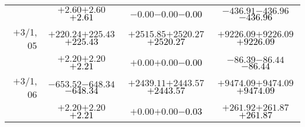 \documentclass[compress]{beamer}
\begin{document}
\begin{frame}
{\begin{tabular}{r | c | c | c}
           & $+2.60$\hspace{0.1 cm}$+2.60$\hspace{0.1 cm}\textcolor{black}{$+2.61$} & $-0.00$\hspace{0.1 cm}$-0.00$\hspace{0.1 cm}\textcolor{black}{$-0.00$} & $-436.91$\hspace{0.1 cm}$-436.96$\hspace{0.1 cm}\textcolor{black}{$-436.96$} \\
$+$3/1, 05 & $+220.24$\hspace{0.1 cm}$+225.43$\hspace{0.1 cm}\textcolor{black}{$+225.43$} & $+2515.85$\hspace{0.1 cm}$+2520.27$\hspace{0.1 cm}\textcolor{black}{$+2520.27$} & $+9226.09$\hspace{0.1 cm}$+9226.09$\hspace{0.1 cm}\textcolor{black}{$+9226.09$} \\
           & $+2.20$\hspace{0.1 cm}$+2.20$\hspace{0.1 cm}\textcolor{black}{$+2.21$} & $+0.00$\hspace{0.1 cm}$+0.00$\hspace{0.1 cm}\textcolor{black}{$-0.00$} & $-86.39$\hspace{0.1 cm}$-86.44$\hspace{0.1 cm}\textcolor{black}{$-86.44$} \\
$+$3/1, 06 & $-653.52$\hspace{0.1 cm}$-648.34$\hspace{0.1 cm}\textcolor{black}{$-648.34$} & $+2439.11$\hspace{0.1 cm}$+2443.57$\hspace{0.1 cm}\textcolor{black}{$+2443.57$} & $+9474.09$\hspace{0.1 cm}$+9474.09$\hspace{0.1 cm}\textcolor{black}{$+9474.09$} \\
           & $+2.20$\hspace{0.1 cm}$+2.20$\hspace{0.1 cm}\textcolor{black}{$+2.21$} & $+0.00$\hspace{0.1 cm}$+0.00$\hspace{0.1 cm}\textcolor{black}{$-0.03$} & $+261.92$\hspace{0.1 cm}$+261.87$\hspace{0.1 cm}\textcolor{black}{$+261.87$} \\
\end{tabular}}
\end{frame}
\end{document}

